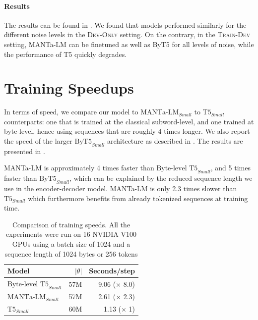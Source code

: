 
\paragraph{Results} The results can be found in . We found that models performed similarly for the different noise levels in the \textsc{Dev-Only} setting. On the contrary, in the \textsc{Train-Dev} setting, MANTa-LM can be finetuned as well as ByT5 for all levels of noise, while the performance of T5 quickly degrades.

\section{Training Speedups}

In terms of speed, we compare our model to $\text{MANTa-LM}_{Small}$ to $\text{T5}_{Small}$ counterparts: one that is trained at the classical subword-level, and one trained at byte-level, hence using sequences that are roughly 4 times longer. We also report the speed of the larger $\text{ByT5}_{Small}$ architecture as described in \citet{xue2022byt5}. The results are presented in .

MANTa-LM is approximately 4 times faster than $\text{Byte-level T5}_{Small}$, and 5 times faster than $\text{ByT5}_{Small}$, which can be explained by the reduced sequence length we use in the encoder-decoder model. MANTa-LM is only 2.3 times slower than $\text{T5}_{Small}$ which furthermore benefits from already tokenized sequences at training time.

\begin{table}[t]
    \centering\small
    \begin{tabular}{lrr}
    \toprule
    Model                           & $|\theta|$ & Seconds/step         \\ \midrule
    $\text{Byte-level T5}_{Small}$   & 57M       & 9.06 ($\times$ 8.0)  \\[3pt]
    $\text{MANTa-LM}_{Small}$    & 57M        & 2.61 ($\times$ 2.3)    \\[3pt]
    $\text{T5}_{Small}$      & 60M        & 1.13 ($\times$ 1)      \\ \bottomrule
    \end{tabular}
    \caption{Comparison of training speeds. All the experiments were run on 16 NVIDIA V100 GPUs using a batch size of 1024 and a sequence length of 1024 bytes or 256 tokens}
    \label{tab:speed}
\end{table}
    

